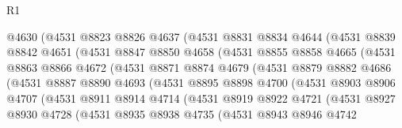\begin{lexlean}{R1}
\begin{coremodule}
                  @4630
                  (@4531
                    @8823
                    @8826
                    @4637
                    (@4531
                      @8831
                      @8834
                      @4644
                      (@4531
                        @8839
                        @8842
                        @4651
                        (@4531
                          @8847
                          @8850
                          @4658
                          (@4531
                            @8855
                            @8858
                            @4665
                            (@4531
                              @8863
                              @8866
                              @4672
                              (@4531
                                @8871
                                @8874
                                @4679
                                (@4531
                                  @8879
                                  @8882
                                  @4686
                                  (@4531
                                    @8887
                                    @8890
                                    @4693
                                    (@4531
                                      @8895
                                      @8898
                                      @4700
                                      (@4531
                                        @8903
                                        @8906
                                        @4707
                                        (@4531
                                          @8911
                                          @8914
                                          @4714
                                          (@4531
                                            @8919
                                            @8922
                                            @4721
                                            (@4531
                                              @8927
                                              @8930
                                              @4728
                                              (@4531
                                                @8935
                                                @8938
                                                @4735
                                                (@4531
                                                  @8943
                                                  @8946
                                                  @4742

\end{coremodule}
\end{lexlean}
